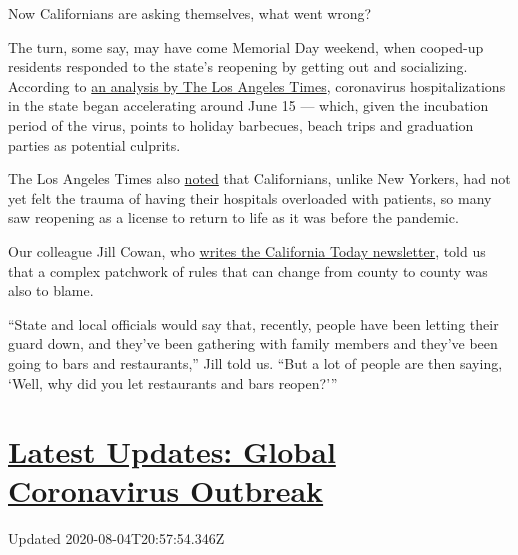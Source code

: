 Now Californians are asking themselves, what went wrong?

The turn, some say, may have come Memorial Day weekend, when cooped-up
residents responded to the state's reopening by getting out and
socializing. According to
\href{https://www.latimes.com/california/story/2020-06-29/california-coronavirus-hot-spot-memorial-day}{an
analysis by The Los Angeles Times}, coronavirus hospitalizations in the
state began accelerating around June 15 --- which, given the incubation
period of the virus, points to holiday barbecues, beach trips and
graduation parties as potential culprits.

The Los Angeles Times also
\href{https://www.latimes.com/california/story/2020-06-29/california-coronavirus-hot-spot-memorial-day}{noted}
that Californians, unlike New Yorkers, had not yet felt the trauma of
having their hospitals overloaded with patients, so many saw reopening
as a license to return to life as it was before the pandemic.

Our colleague Jill Cowan, who
\href{https://www.nytimes.com/column/california-today}{writes the
California Today newsletter}, told us that a complex patchwork of rules
that can change from county to county was also to blame.

``State and local officials would say that, recently, people have been
letting their guard down, and they've been gathering with family members
and they've been going to bars and restaurants,'' Jill told us. ``But a
lot of people are then saying, `Well, why did you let restaurants and
bars reopen?'''

\hypertarget{latest-updates-global-coronavirus-outbreak}{%
\section{\texorpdfstring{\href{https://www.nytimes.com/2020/08/04/world/coronavirus-cases.html?action=click\&pgtype=Article\&state=default\&region=MAIN_CONTENT_1\&context=storylines_live_updates}{Latest
Updates: Global Coronavirus
Outbreak}}{Latest Updates: Global Coronavirus Outbreak}}\label{latest-updates-global-coronavirus-outbreak}}

Updated 2020-08-04T20:57:54.346Z

